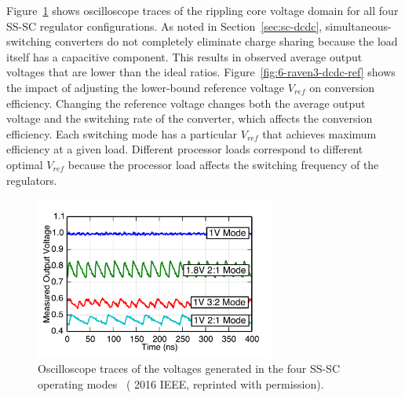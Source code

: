 \documentclass[graybox]{svmult}
\begin{document}
%
%
Figure~\ref{fig:6-raven3-dcdc-waveforms} shows oscilloscope traces of the rippling core voltage domain for all four SS-SC regulator configurations.
As noted in Section~\ref{sec:sc-dcdc}, simultaneous-switching converters do not completely eliminate charge sharing because the load itself has a capacitive component.
This results in observed average output voltages that are lower than the ideal ratios.
Figure~\ref{fig:6-raven3-dcdc-ref} shows the impact of adjusting the lower-bound reference voltage $V_{ref}$ on conversion efficiency.
Changing the reference voltage changes both the average output voltage and the switching rate of the converter, which affects the conversion efficiency.
Each switching mode has a particular $V_{ref}$ that achieves maximum efficiency at a given load.
Different processor loads correspond to different optimal $V_{ref}$ because the processor load affects the switching frequency of the regulators.

\begin{figure}
  \centering
  \includegraphics[width=0.7\textwidth]{6-raven3-dcdc-waveforms}
  \caption{Oscilloscope traces of the voltages generated in the four SS-SC operating modes~\cite{Zimmer2016} ({\textcopyright} 2016 IEEE, reprinted with permission).}
  \label{fig:6-raven3-dcdc-waveforms}
\end{figure}
\end{document}
